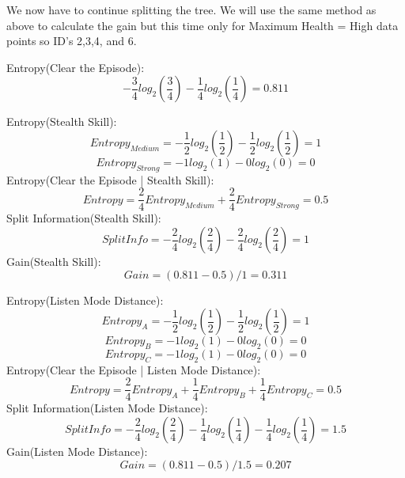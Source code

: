 \documentclass{article}
\begin{document}
\begin{enumerate}[label=(\roman*)]
We now have to continue splitting the tree. We will use the same method as above to calculate the gain but this time only for Maximum Health = High data points so ID's 2,3,4, and 6.

Entropy(Clear the Episode):
\begin{equation}
    -\frac{3}{4}log_2(\frac{3}{4}) - \frac{1}{4}log_2(\frac{1}{4}) = 0.811
\end{equation}

Entropy(Stealth Skill):
\begin{equation}
    Entropy_{Medium} = -\frac{1}{2}log_2(\frac{1}{2}) - \frac{1}{2}log_2(\frac{1}{2}) = 1
\end{equation}
\begin{equation}
    Entropy_{Strong} = -1log_2(1) - 0log_2(0) = 0
\end{equation}
Entropy(Clear the Episode | Stealth Skill):
\begin{equation}
    Entropy = \frac{2}{4}Entropy_{Medium} + \frac{2}{4}Entropy_{Strong} = 0.5
\end{equation}
Split Information(Stealth Skill):
\begin{equation}
    SplitInfo = -\frac{2}{4}log_2(\frac{2}{4}) - \frac{2}{4}log_2(\frac{2}{4}) = 1
\end{equation}
Gain(Stealth Skill):
\begin{equation}
    Gain = (0.811 - 0.5) / 1 = 0.311
\end{equation}

Entropy(Listen Mode Distance):
\begin{equation}
    Entropy_{A} = -\frac{1}{2}log_2(\frac{1}{2}) - \frac{1}{2}log_2(\frac{1}{2}) = 1
\end{equation}
\begin{equation}
    Entropy_{B} = -1log_2(1) - 0log_2(0) = 0
\end{equation}
\begin{equation}
    Entropy_{C} = -1log_2(1) - 0log_2(0) = 0
\end{equation}
Entropy(Clear the Episode | Listen Mode Distance):
\begin{equation}
    Entropy = \frac{2}{4}Entropy_{A} + \frac{1}{4}Entropy_{B} + \frac{1}{4}Entropy_{C} = 0.5
\end{equation}
Split Information(Listen Mode Distance):
\begin{equation}
    SplitInfo = -\frac{2}{4}log_2(\frac{2}{4}) - \frac{1}{4}log_2(\frac{1}{4}) - \frac{1}{4}log_2(\frac{1}{4}) = 1.5
\end{equation}
Gain(Listen Mode Distance):
\begin{equation}
    Gain = (0.811 - 0.5) / 1.5 = 0.207
\end{equation}


\end{enumerate}
\end{document}
